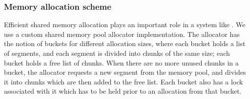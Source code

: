 



\subsubsection{Memory allocation scheme}  

Efficient shared memory allocation plays an important role in a system
like \varan.  We use a custom shared memory pool allocator implementation.
The allocator has the notion of buckets for different allocation sizes,
where each bucket holds a list of segments, and each segment is
divided into chunks of the same size; each bucket holds a free list of
chunks.  When there are no more unused chunks in a bucket, the
allocator requests a new segment from the memory pool, and divides it
into chunks which are then added to the free list. Each bucket also
has a lock associated with it which has to be held prior to an
allocation from that bucket. 

